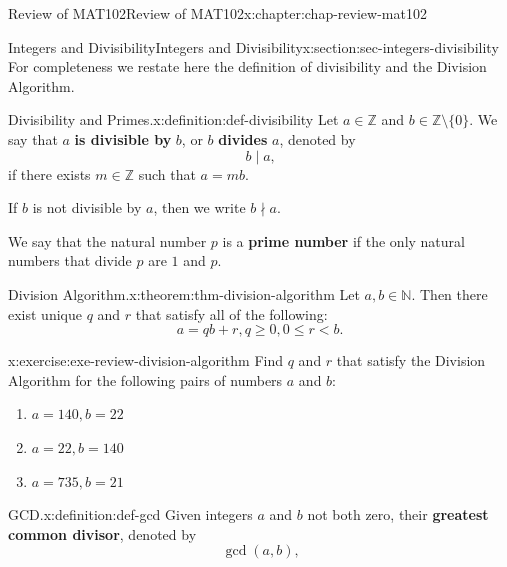 \documentclass[oneside,10pt,]{book}
\newcommand{\terminology}[1]{\textbf{#1}}
\numberwithin{equation}{section}
\newcommand{\lt}{<}
\begin{document}
\begin{chapterptx}{Review of MAT102}{}{Review of MAT102}{}{}{x:chapter:chap-review-mat102}
\typeout{************************************************}
%
\begin{sectionptx}{Integers and Divisibility}{}{Integers and Divisibility}{}{}{x:section:sec-integers-divisibility}
For completeness we restate here the definition of divisibility and the Division Algorithm.%
\begin{definition}{Divisibility and Primes.}{x:definition:def-divisibility}%
\label{g:notation:id450816} Let \(a \in \mathbb{Z}\) and \(b \in \mathbb{Z} \setminus \{0\}\). We say that \(a\) \terminology{is divisible by} \(b\), or \(b\) \terminology{divides} \(a\), denoted by%
\begin{equation*}
b \mid a\text{,}
\end{equation*}
if there exists \(m \in \mathbb{Z}\) such that \(a = mb\).%
\par
If \(b\) is not divisible by \(a\), then we write \(b \nmid a\).%
\par
We say that the natural number \(p\) is a \terminology{prime number} if the only natural numbers that divide \(p\) are \(1\) and \(p\).%
\end{definition}
\begin{theorem}{Division Algorithm.}{}{x:theorem:thm-division-algorithm}%
Let \(a,b \in \mathbb{N}\). Then there exist unique \(q\) and \(r\) that satisfy all of the following:%
\begin{equation*}
a = qb + r, q \geq 0, 0 \leq r \lt b\text{.}
\end{equation*}
%
\end{theorem}
\begin{inlineexercise}{}{x:exercise:exe-review-division-algorithm}%
Find \(q\) and \(r\) that satisfy the Division Algorithm for the following pairs of numbers \(a\) and \(b\):%
\begin{enumerate}[label=(\alph*)]
\item{}\(\displaystyle a = 140, b = 22\)%
\item{}\(\displaystyle a = 22, b = 140\)%
\item{}\(\displaystyle a = 735, b = 21\)%
\end{enumerate}
%
\end{inlineexercise}
\begin{definition}{GCD.}{x:definition:def-gcd}%
\label{g:notation:id449019} Given integers \(a\) and \(b\) not both zero, their \terminology{greatest common divisor}, denoted by%
\begin{equation*}
\gcd(a,b)\text{,}

\end{equation*}
\end{definition}
\end{sectionptx}
\end{chapterptx}
\end{document}
